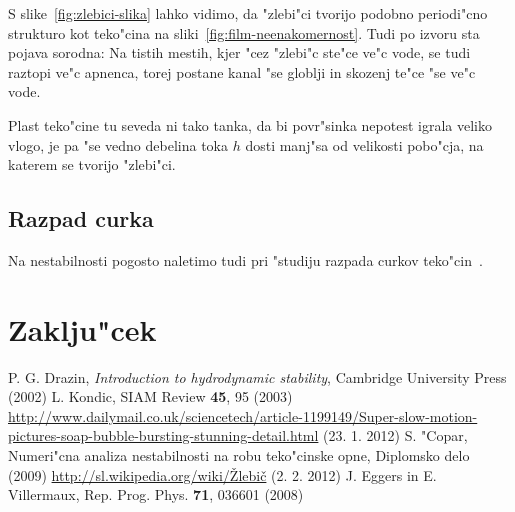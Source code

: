 \documentclass[a4paper,10pt]{article}
\begin{document}
S slike~\ref{fig:zlebici-slika} lahko vidimo, da "zlebi"ci tvorijo podobno periodi"cno strukturo kot teko"cina na sliki~\ref{fig:film-neenakomernost}. Tudi po izvoru sta pojava sorodna: Na tistih mestih, kjer "cez "zlebi"c ste"ce ve"c vode, se tudi raztopi ve"c apnenca, torej postane kanal "se globlji in skozenj te"ce "se ve"c vode. 

Plast teko"cine tu seveda ni tako tanka, da bi povr"sinka nepotest igrala veliko vlogo, je pa "se vedno debelina toka $h$ dosti manj"sa od velikosti pobo"cja, na katerem se tvorijo "zlebi"ci. 


\subsection{Razpad curka}

Na nestabilnosti pogosto naletimo tudi pri "studiju razpada curkov teko"cin~\cite{eggers}. 

\section{Zaklju"cek}

\begin{thebibliography}{3}
   P. G. Drazin, \textit{Introduction to hydrodynamic stability}, Cambridge University Press (2002)
   L. Kondic, SIAM Review \textbf{45}, 95 (2003)
   \url{http://www.dailymail.co.uk/sciencetech/article-1199149/Super-slow-motion-pictures-soap-bubble-bursting-stunning-detail.html} (23. 1. 2012)
   S. "Copar, Numeri"cna analiza nestabilnosti na robu teko"cinske opne, Diplomsko delo (2009)
   \href{http://sl.wikipedia.org/wiki/\%C5\%BDlebi\%C4\%8Di}{http://sl.wikipedia.org/wiki/\v Zlebič} (2. 2. 2012)
   J. Eggers in E. Villermaux, Rep. Prog. Phys. \textbf{71}, 036601 (2008)
\end{thebibliography}
\end{document}
